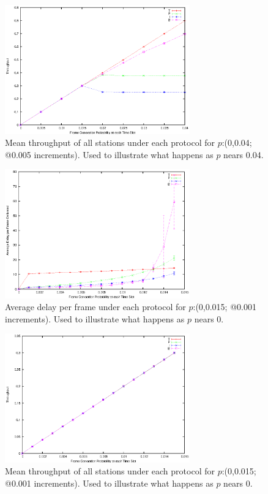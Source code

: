 \documentclass[twocolumn]{article}
\begin{document}
\begin{figure}
    \centering \includegraphics[width=8cm]{plots/throughput_big.eps}
    \caption{\footnotesize Mean throughput of all stations under each protocol
    for $p$:(0,0.04; @0.005 increments). Used to illustrate what happens as $p$
    nears 0.04.} \label{fig:throughput_big}
\end{figure}

\begin{figure}
    \centering \includegraphics[width=8cm]{plots/small_delay.eps}
    \caption{\footnotesize Average delay per frame under each protocol for
    $p$:(0,0.015; @0.001 increments). Used to illustrate what happens as $p$
    nears 0.} \label{fig:delay_small}
\end{figure}

\begin{figure}
    \centering \includegraphics[width=8cm]{plots/small_throughput.eps}
    \caption{\footnotesize Mean throughput of all stations under each protocol
    for $p$:(0,0.015; @0.001 increments). Used to illustrate what happens as $p$
    nears 0.} \label{fig:throughput_small}
\end{figure}
\end{document}
